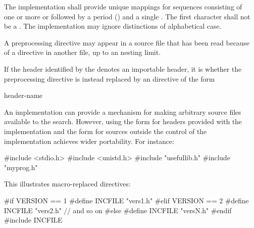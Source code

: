 \documentclass{wg21}
\newcommand{\clb}[1]{\removed{#1} \added{\grammarterm{line-break}}}
\begin{document}
\pnum
The implementation shall provide unique mappings for
sequences consisting of one or more
 or 
followed by a period
()
and a single
.
The first character shall not be a .
The implementation may ignore distinctions of alphabetical case.

\pnum
A
preprocessing directive may appear
in a source file that has been read because of a
directive in another file,
up to an  nesting limit.

\pnum
If the header identified by the 
denotes an importable header,
it is
whether the  preprocessing directive
is instead replaced by an  directive of the form
\begin{ncbnf}
     header-name \terminal{;} \clb{new-line}
\end{ncbnf}

\pnum
\begin{note}
    An implementation can provide a mechanism for making arbitrary
    source files available to the \tcode{< >} search.
    However, using the \tcode{< >} form for headers provided
    with the implementation and the  form for sources
    outside the control of the implementation
    achieves wider portability. For instance:

    \begin{codeblock}
        #include <stdio.h>
        #include <unistd.h>
        #include "usefullib.h"
        #include "myprog.h"
    \end{codeblock}

\end{note}

\pnum
\begin{example}
    This illustrates macro-replaced
    directives:

    \begin{codeblock}
        #if VERSION == 1
        #define INCFILE  "vers1.h"
        #elif VERSION == 2
        #define INCFILE  "vers2.h"  // and so on
        #else
        #define INCFILE  "versN.h"
        #endif
        #include INCFILE
    \end{codeblock}
\end{example}
\end{document}

